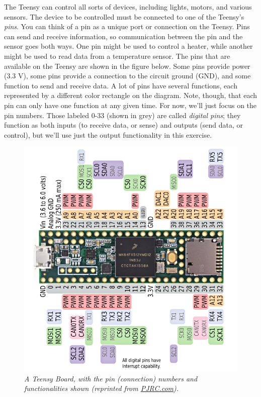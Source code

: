\documentclass[]{book}
\begin{document}
The Teensy can control all sorts of devices, including lights, motors, and various sensors. The device to be controlled must be connected to one of the Teensy's \emph{pins}. You can think of a pin as a unique port or connection on the Teensy. Pins can send and receive information, so communication between the pin and the sensor goes both ways. One pin might be used to control a heater, while another might be used to read data from a temperature sensor. The pins that are available on the Teensy are shown in the figure below. Some pins provide power (3.3 V), some pins provide a connection to the circuit ground (GND), and some function to send and receive data. A lot of pins have several functions, each represented by a different color rectangle on the diagram. Note, though, that each pin can only have one function at any given time. For now, we'll just focus on the pin numbers. Those labeled 0-33 (shown in grey) are called \emph{digital pins}; they function as both inputs (to receive data, or sense) and outputs (send data, or control), but we'll use just the output functionality in this exercise.

\begin{figure}
\centering
\includegraphics{images/card8a_rev2.png}
\caption{\emph{A Teensy Board, with the pin (connection) numbers and functionalities shown (reprinted from \href{https://www.pjrc.com/teensy/pinout.html}{PJRC.com}).}}
\end{figure}
\end{document}
